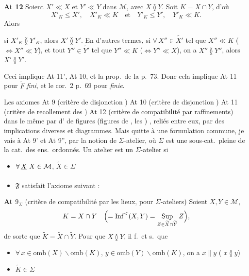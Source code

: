 \documentclass[11pt,a4paper]{article}
\begin{document}
\textbf{At 12} Soient $X' \ll X$ et $Y' \ll Y$ dans $\mathcal{M}$, avec $X \between Y$. Soit $K = X \cap Y$, d'où
\[
  X'_K \leq X', \quad X'_K \ll K \quad \text{et} \quad Y'_K \leq Y', \quad Y'_K \ll K .
\]
 Alors

si $X'_K \between Y'_K$, alors $X' \between Y'$. En d'autres termes, si $\forall\, X'' \in \widetilde{X'}$ tel que $X'' \ll K$ ($\Leftrightarrow X'' \ll Y$), et tout $Y'' \in \widetilde{Y'}$ tel que $Y'' \ll K$ ($\Leftrightarrow Y'' \ll X$), on a $X'' \between Y''$, alors $X' \between Y'$.

Ceci implique At 11', At 10, et la prop.\ de la p.~73. Donc cela implique At 11 pour  $\widetilde{F}$ \emph{fini}, et le cor.\ 2 p.~69 pour \ill{} \emph{finie}. 


\struck{\ill{}} Les axiomes At 9 (critère de disjonction )  At 10 (critère de disjonction ) At 11 (critère de recollement des \ill{} ) At 12 (critère de compatibilité par raffinements) \ill{} dans le même \ill{} par \ill{} \ill{} d' de figures (figures de \ill{}, \ill{} les \ill{} \ill{})  \ill{}, reliés entre eux, par des implications diverses et diagrammes. Mais quitte  à  une formulation commune, je vais \ill{} à At 9' et At 9'', par la notion de $\Sigma$-atelier, où $\Sigma$ est une sous-cat.\ pleine de la cat.\ des ens.\ ordonnés. Un atelier est un $\Sigma$-atelier si
\begin{itemize}
  \item[(i)] $\forall\, \struck{X}\ X \in \mathcal{M}$, $\widetilde{X} \in \Sigma$
  \item[(ii)] $\mathfrak{F}$ satisfait l'axiome suivant :
\end{itemize}

\textbf{At $9_{\Sigma}$} (critère de compatibilité par les lieux, pour $\Sigma$-ateliers) Soient $X, Y \in \mathcal{M}$,  \struck{\ill{}}
\[
  K = X \cap Y \quad \Bigl( = \mathrm{Inf}^{\leq}(X, Y) = \operatorname*{Sup}_{Z \in \widetilde{X} \cap \widetilde{Y}} Z \Bigr),
\]
de sorte que $\widetilde{K} = \widetilde{X} \cap \widetilde{Y}$. Pour que $X \between Y$, \struck{\ill{}} il f.\ et s.\ que
\begin{itemize}
  \item[(i)] $\forall\, x \in \mathrm{omb}(X) \smallsetminus \mathrm{omb}(K)$, $y \in \mathrm{omb}(Y) \smallsetminus \mathrm{omb}(K)$, on a $x \parallel y$ ( $x \between y$)
  \item[(ii)] $\widetilde{K} \in \Sigma$
\end{itemize}
\end{document}
